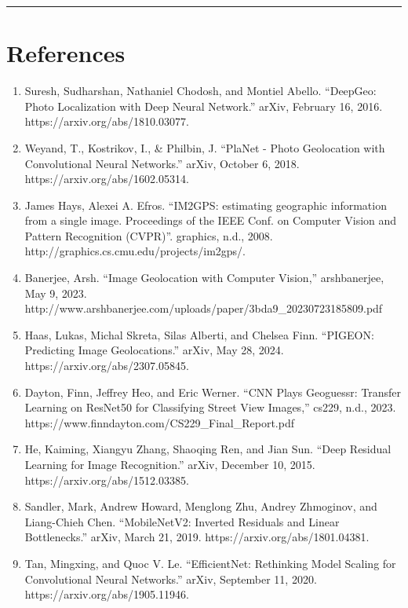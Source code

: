 \begin{center}\rule{0.5\linewidth}{0.5pt}\end{center}

\section{References}\label{references}

\begin{enumerate}
\def\labelenumi{\arabic{enumi}.}
\tightlist
\item
  Suresh, Sudharshan, Nathaniel Chodosh, and Montiel Abello. ``DeepGeo:
  Photo Localization with Deep Neural Network.'' arXiv, February 16,
  2016. https://arxiv.org/abs/1810.03077.
\item
  Weyand, T., Kostrikov, I., \& Philbin, J. ``PlaNet - Photo Geolocation
  with Convolutional Neural Networks.'' arXiv, October 6, 2018.
  https://arxiv.org/abs/1602.05314.
\item
  James Hays, Alexei A. Efros. ``IM2GPS: estimating geographic
  information from a single image. Proceedings of the IEEE Conf. on
  Computer Vision and Pattern Recognition (CVPR)''. graphics, n.d.,
  2008. http://graphics.cs.cmu.edu/projects/im2gps/.
\item
  Banerjee, Arsh. ``Image Geolocation with Computer Vision,''
  arshbanerjee, May 9, 2023.
  http://www.arshbanerjee.com/uploads/paper/3bda9\_20230723185809.pdf
\item
  Haas, Lukas, Michal Skreta, Silas Alberti, and Chelsea Finn. ``PIGEON:
  Predicting Image Geolocations.'' arXiv, May 28, 2024.
  https://arxiv.org/abs/2307.05845.
\item
  Dayton, Finn, Jeffrey Heo, and Eric Werner. ``CNN Plays Geoguessr:
  Transfer Learning on ResNet50 for Classifying Street View Images,''
  cs229, n.d., 2023. https://www.finndayton.com/CS229\_Final\_Report.pdf
\item
  He, Kaiming, Xiangyu Zhang, Shaoqing Ren, and Jian Sun. ``Deep
  Residual Learning for Image Recognition.'' arXiv, December 10, 2015.
  https://arxiv.org/abs/1512.03385.
\item
  Sandler, Mark, Andrew Howard, Menglong Zhu, Andrey Zhmoginov, and
  Liang-Chieh Chen. ``MobileNetV2: Inverted Residuals and Linear
  Bottlenecks.'' arXiv, March 21, 2019.
  https://arxiv.org/abs/1801.04381.
\item
  Tan, Mingxing, and Quoc V. Le. ``EfficientNet: Rethinking Model
  Scaling for Convolutional Neural Networks.'' arXiv, September 11,
  2020. https://arxiv.org/abs/1905.11946.
\end{enumerate}

